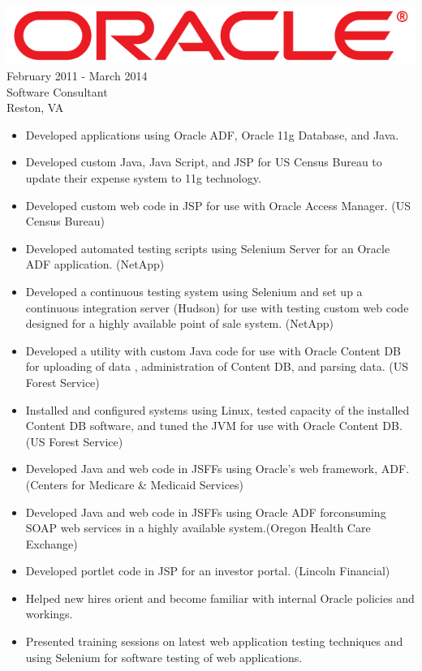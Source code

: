 \documentclass[12pt, line, margin]{res}
\begin{document}
\begin{resume}
                {\sl \includegraphics[scale=0.1]{resume_images/663px-Oracle_logo.png}} \hfill            February 2011 - March 2014 \\
                Software Consultant \\ Reston, VA
                \begin{itemize}  \itemsep -2pt %
                 \item Developed applications using Oracle ADF,
			 Oracle 11g Database, and Java.
	      \item Developed custom Java, Java Script, and JSP for
			 US Census \newline Bureau to update their expense system
			 to 11g technology.
	      \item Developed custom web code in JSP for use with
			 Oracle Access Manager. (US Census Bureau)
	      \item Developed automated testing scripts using Selenium
			 Server for an Oracle ADF application.  (NetApp)
	      \item Developed a continuous testing system using Selenium
			 and set up a continuous integration server (Hudson)
			 for use with testing custom web code designed for a
			 highly available point of sale system. (NetApp)
	      \item Developed a utility with custom Java code for use with
			 Oracle Content DB for uploading of data , administration
			 of Content DB, and parsing data.
			(US Forest Service)
	      \item Installed and configured systems using Linux, tested capacity
			 of the installed Content DB software, and tuned the JVM
			 for use with Oracle Content DB. (US Forest Service)
	      \item Developed Java and web code in JSFFs using Oracle's web \newline framework, ADF.
			 (Centers for Medicare \&  Medicaid Services)
      	      \item Developed Java and web code in JSFFs using Oracle ADF
			 for\newline consuming SOAP web services in a highly available
			 system.\newline (Oregon Health Care Exchange)
	      \item Developed portlet code in JSP for an investor portal.
			\newline(Lincoln Financial)
	      \item Helped new hires orient and become familiar with internal 
			Oracle policies and workings.
	      \item Presented training sessions on latest web application testing 
			\newline techniques and using Selenium for software
			 testing of web \newline applications.
                 \end{itemize} 


\end{resume}
\end{document}
